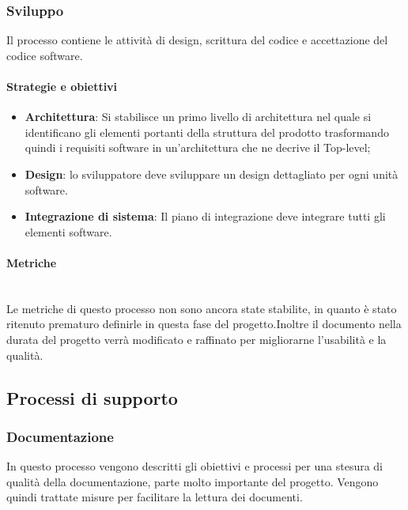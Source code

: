     \newpage  
    
    \subsubsection{Sviluppo}
    Il processo contiene le attività di design, scrittura del codice e accettazione del codice software.
    
        \paragraph{Strategie e obiettivi}
        \begin{itemize}
            \item \textbf{Architettura}: Si stabilisce un primo livello di architettura nel quale si identificano gli elementi portanti della struttura del prodotto trasformando quindi i requisiti software in un'architettura che ne decrive il Top-level;
            \item \textbf{Design}: lo sviluppatore deve sviluppare un design dettagliato per ogni unità software.
            \item \textbf{Integrazione di sistema}: Il piano di integrazione deve integrare tutti gli elementi software.
        \end{itemize}
        
        \paragraph{Metriche}
        \phantom{} \\

        Le metriche di questo processo non sono ancora state stabilite, in quanto è stato ritenuto prematuro definirle in questa fase del progetto.Inoltre il documento nella durata del progetto verrà modificato e raffinato per migliorarne l'usabilità e la qualità.
        
        
        
        \subsection{Processi di supporto}
            \subsubsection{Documentazione}
            In questo processo vengono descritti gli obiettivi e processi per una stesura di qualità della documentazione, parte molto importante del progetto. Vengono quindi trattate misure per facilitare la lettura dei documenti.
            
